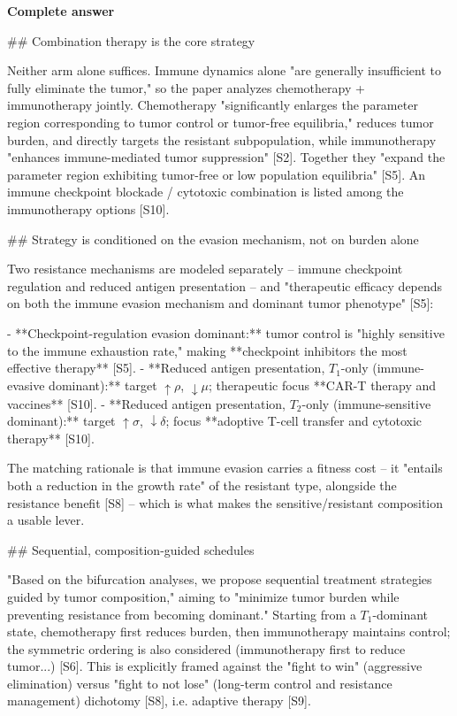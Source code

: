 \documentclass[10pt]{article}
\begin{document}
\textbf{Complete answer}
\begin{AnswerText}
## Combination therapy is the core strategy

Neither arm alone suffices. Immune dynamics alone "are generally insufficient to fully eliminate the tumor," so the paper analyzes chemotherapy + immunotherapy jointly. Chemotherapy "significantly enlarges the parameter region corresponding to tumor control or tumor-free equilibria," reduces tumor burden, and directly targets the resistant subpopulation, while immunotherapy "enhances immune-mediated tumor suppression" [S2]. Together they "expand the parameter region exhibiting tumor-free or low population equilibria" [S5]. An immune checkpoint blockade / cytotoxic combination is listed among the immunotherapy options [S10].

## Strategy is conditioned on the evasion mechanism, not on burden alone

Two resistance mechanisms are modeled separately -- immune checkpoint regulation and reduced antigen presentation -- and "therapeutic efficacy depends on both the immune evasion mechanism and dominant tumor phenotype" [S5]:

- **Checkpoint-regulation evasion dominant:** tumor control is "highly sensitive to the immune exhaustion rate," making **checkpoint inhibitors the most effective therapy** [S5].
- **Reduced antigen presentation, $T_1$-only (immune-evasive dominant):** target $\uparrow\rho$, $\downarrow\mu$; therapeutic focus **CAR-T therapy and vaccines** [S10].
- **Reduced antigen presentation, $T_2$-only (immune-sensitive dominant):** target $\uparrow\sigma$, $\downarrow\delta$; focus **adoptive T-cell transfer and cytotoxic therapy** [S10].

The matching rationale is that immune evasion carries a fitness cost -- it "entails both a reduction in the growth rate" of the resistant type, alongside the resistance benefit [S8] -- which is what makes the sensitive/resistant composition a usable lever.

## Sequential, composition-guided schedules

"Based on the bifurcation analyses, we propose sequential treatment strategies guided by tumor composition," aiming to "minimize tumor burden while preventing resistance from becoming dominant." Starting from a $T_1$-dominant state, chemotherapy first reduces burden, then immunotherapy maintains control; the symmetric ordering is also considered (immunotherapy first to reduce tumor...) [S6]. This is explicitly framed against the "fight to win" (aggressive elimination) versus "fight to not lose" (long-term control and resistance management) dichotomy [S8], i.e. adaptive therapy [S9].


\end{AnswerText}
\end{document}
